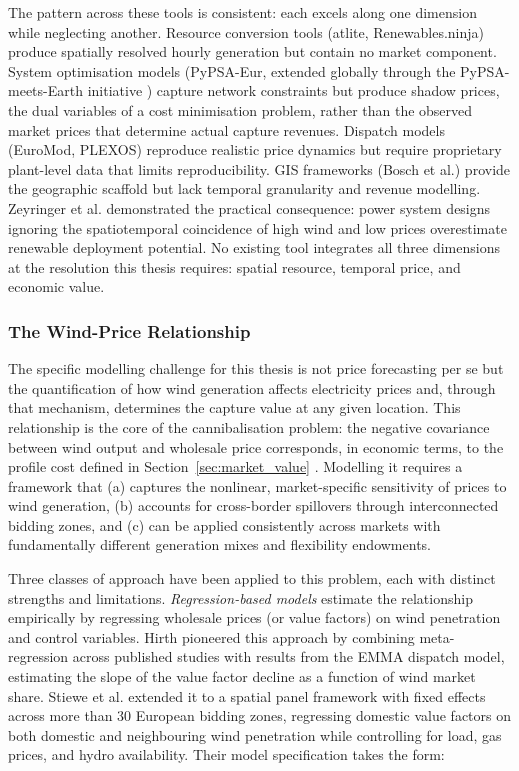The pattern across these tools is consistent: each excels along one dimension while neglecting another. Resource conversion tools (atlite, Renewables.ninja) produce spatially resolved hourly generation but contain no market component. System optimisation models (PyPSA-Eur, extended globally through the PyPSA-meets-Earth initiative \cite{PyPSAEarth2024}) capture network constraints but produce shadow prices, the dual variables of a cost minimisation problem, rather than the observed market prices that determine actual capture revenues. Dispatch models (EuroMod, PLEXOS) reproduce realistic price dynamics but require proprietary plant-level data that limits reproducibility. GIS frameworks (Bosch et al.) provide the geographic scaffold but lack temporal granularity and revenue modelling. Zeyringer et al. \cite{Zeyringer2018} demonstrated the practical consequence: power system designs ignoring the spatiotemporal coincidence of high wind and low prices overestimate renewable deployment potential. No existing tool integrates all three dimensions at the resolution this thesis requires: spatial resource, temporal price, and economic value.

\subsubsection{The Wind-Price Relationship}\label{sec:wind_price}

The specific modelling challenge for this thesis is not price forecasting per se but the quantification of how wind generation affects electricity prices and, through that mechanism, determines the capture value at any given location. This relationship is the core of the cannibalisation problem: the negative covariance between wind output and wholesale price corresponds, in economic terms, to the profile cost defined in Section~\ref{sec:market_value} \cite{Hirth2015, Ueckerdt2013}. Modelling it requires a framework that (a) captures the nonlinear, market-specific sensitivity of prices to wind generation, (b) accounts for cross-border spillovers through interconnected bidding zones, and (c) can be applied consistently across markets with fundamentally different generation mixes and flexibility endowments.

\vspace{4pt}

Three classes of approach have been applied to this problem, each with distinct strengths and limitations. \textit{Regression-based models} estimate the relationship empirically by regressing wholesale prices (or value factors) on wind penetration and control variables. Hirth \cite{Hirth2013} pioneered this approach by combining meta-regression across published studies with results from the EMMA dispatch model, estimating the slope of the value factor decline as a function of wind market share. Stiewe et al. \cite{Stiewe2025} extended it to a spatial panel framework with fixed effects across more than 30 European bidding zones, regressing domestic value factors on both domestic and neighbouring wind penetration while controlling for load, gas prices, and hydro availability. Their model specification takes the form:


